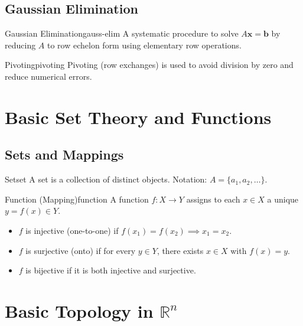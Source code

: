 \subsection{Gaussian Elimination}

\begin{definition}{Gaussian Elimination}{gauss-elim}
    A systematic procedure to solve \(A\mathbf{x} = \mathbf{b}\) by reducing \(A\) to row echelon form using elementary row operations.
\end{definition}

\begin{remark}{Pivoting}{pivoting}
    Pivoting (row exchanges) is used to avoid division by zero and reduce numerical errors.
\end{remark}

\section{Basic Set Theory and Functions}

\subsection{Sets and Mappings}

\begin{definition}{Set}{set}
    A set is a collection of distinct objects. Notation: \(A = \{a_1, a_2, \ldots\}\).
\end{definition}

\begin{definition}{Function (Mapping)}{function}
    A function \(f : X \to Y\) assigns to each \(x \in X\) a unique \(y = f(x) \in Y\).
\end{definition}

\begin{itemize}[nosep]
    \item \(f\) is injective (one-to-one) if \(f(x_1) = f(x_2) \implies x_1 = x_2\).
    \item \(f\) is surjective (onto) if for every \(y \in Y\), there exists \(x \in X\) with \(f(x) = y\).
    \item \(f\) is bijective if it is both injective and surjective.
\end{itemize}

\section{Basic Topology in \texorpdfstring{$\mathbb{R}^n$}{Rn}}

